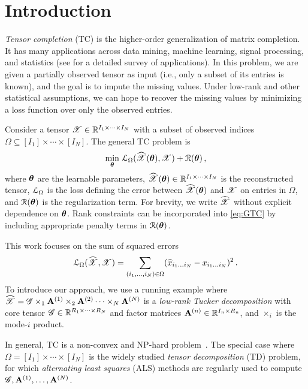 \section{Introduction}
\label{sec:introduction}

\emph{Tensor completion} (TC) is the higher-order generalization of matrix completion.
It has many applications across data mining, machine learning, signal processing, and statistics
(see \citet{song2019tensor} for a detailed survey of applications).
In this problem, we are given a partially observed tensor as input
(i.e., only a subset of its entries is known),
and the goal is to impute the missing values.
Under low-rank and other statistical assumptions,
we can hope to recover the missing values by minimizing a loss function over only the observed entries.

Consider a tensor $\bm{\mathscr{X}} \in \mathbb{R}^{I_1 \times \cdots \times I_N}$
with a subset of observed indices $\Omega \subseteq [I_1] \times \cdots \times [I_N]$.
The general TC problem is
\begin{equation}
\label{eq:GTC}
    \min_{\boldsymbol{\theta}}\, \mathcal{L}_{\Omega} (\widehat{\bm{\mathscr{X}}}(\boldsymbol{\theta}), \bm{\mathscr{X}}) + \mathcal{R}(\boldsymbol{\theta})\,,
\end{equation}
where $\boldsymbol{\theta}$ are the learnable parameters, $\widehat{\bm{\mathscr{X}}}(\boldsymbol{\theta}) \in \mathbb{R}^{I_1 \times \cdots \times I_N}$ is the reconstructed tensor, $\mathcal{L}_{\Omega}$ is the loss defining the error between $\widehat{\bm{\mathscr{X}}}(\boldsymbol{\theta})$ and $\bm{\mathscr{X}}$ on entries in $\Omega$,
and $\mathcal{R}(\boldsymbol{\theta})$ is the regularization term. For brevity, we write $\widehat{\bm{\mathscr{X}}}$ without explicit dependence on $\boldsymbol{\theta}$.
Rank constraints can be incorporated into \eqref{eq:GTC} by including appropriate penalty terms in $\mathcal{R}(\boldsymbol{\theta})$.

This work focuses on the sum of squared errors
\begin{equation}
\label{eq:sum-of-square}
    \mathcal{L}_{\Omega}(\widehat{\bm{\mathscr{X}}}, \bm{\mathscr{X}})
    =
    \sum_{(i_1,\ldots,i_N) \in \Omega} (\widehat{x}_{i_1\ldots i_N} - x_{i_1\ldots i_N})^2\,.
\end{equation}
To introduce our approach, we use a running example where
$\widehat{\bm{\mathscr{X}}} = \bm{\mathscr{G}} \times_1 \mathbf{A}^{(1)} \times_2 \mathbf{A}^{(2)} \cdots \times_N \mathbf{A}^{(N)}$
is a \emph{low-rank Tucker decomposition}
with core tensor $\bm{\mathscr{G}} \in \mathbb{R}^{R_1 \times \dots \times R_N}$ and
factor matrices $\mathbf{A}^{(n)} \in \mathbb{R}^{I_n \times R_n}$, and $\times_i$ is the mode-$i$ product.

In general, TC is a non-convex and NP-hard problem~\citep{hillar2013most}.
The special case where $\Omega = [I_1] \times \cdots \times [I_N]$
is the widely studied \emph{tensor decomposition} (TD) problem,
for which \emph{alternating least squares} (ALS) methods are regularly used to compute $\bm{\mathscr{G}}, \mathbf{A}^{(1)}, \ldots, \mathbf{A}^{(N)}$.

